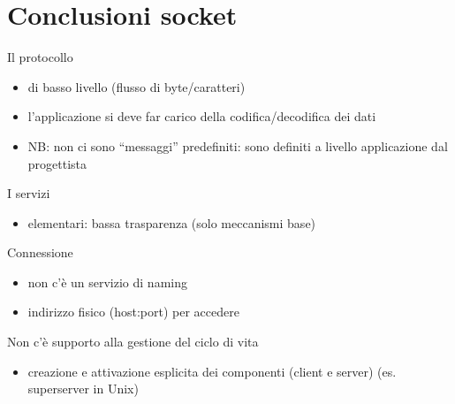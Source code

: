 \section{Conclusioni socket}
Il protocollo
\begin{itemize}
    \item di basso livello (flusso di byte/caratteri)
    \item l'applicazione si deve far carico della codifica/decodifica dei dati
    \item NB: non ci sono “messaggi” predefiniti: sono definiti a livello applicazione dal progettista
\end{itemize}
I servizi
\begin{itemize}
    \item elementari: bassa trasparenza (solo meccanismi base)
\end{itemize}
Connessione
\begin{itemize}
    \item non c'è un servizio di naming
    \item indirizzo fisico (host:port) per accedere
\end{itemize}
Non c'è supporto alla gestione del ciclo di vita
\begin{itemize}
    \item creazione e attivazione esplicita dei componenti (client e server) (es. superserver in Unix)
\end{itemize}